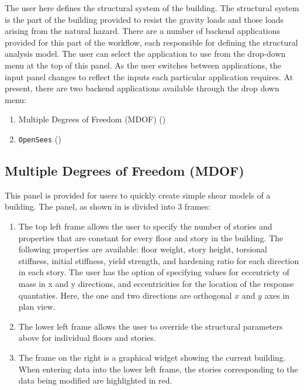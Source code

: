 The user here defines the structural system of the
building. The  structural system is the part of the building provided
to resist the gravity loads and those loads arising from the natural hazard. 
There are a number of backend applications provided for this part of the workflow, 
each responsible for defining the structural analysis model. The user can select 
the application to use from the drop-down menu at the top of this panel. As the 
user switches between applications,
the input panel changes to reflect the inputs each particular application requires. At present, there are two backend applications
available through the drop down menu: 

\begin{enumerate}
\item Multiple Degrees of Freedom (MDOF) ()
\item \texttt{OpenSees} ()
\end{enumerate}

\subsection{Multiple Degrees of Freedom (MDOF)}\label{sec:MDOF}

This panel is provided for users to quickly create simple shear models
of a building. The panel, as shown in  is divided
into 3 frames:
\begin{enumerate}
\item The top left frame allows the user to specify the number of stories and properties that are constant for every floor and story in the building. The following properties are available: floor weight, story height, torsional stiffness, initial stiffness, yield strength, and hardening ratio for each direction in each story. The user has the option of specifying values for eccentricty of mass in x and y directions, and eccentricities for the location of the response quantaties. Here, the one and two directions are orthogonal $x$ and $y$ axes in plan view.
\item The lower left frame allows the user to override the structural parameters above for individual floors and stories.
\item The frame on the right is a graphical widget showing the current building. When entering data into the lower left frame, the stories corresponding to the data being modified are highlighted in red.
\end{enumerate}

